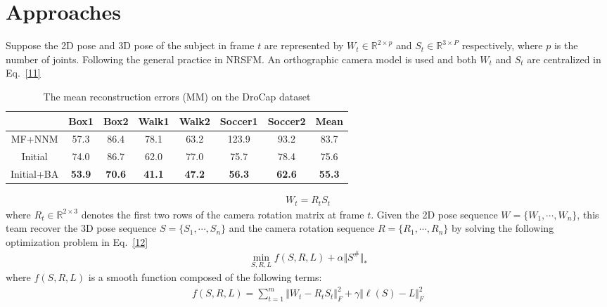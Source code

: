 \documentclass[10pt,twocolumn,letterpaper]{article}
\begin{document}
\section{Approaches}
Suppose the 2D pose and 3D pose of the subject in frame $t$ are represented by $W_t\in\mathbb{R}^{2\times p}$ and $S_t\in\mathbb{R}^{3\times P}$ respectively, where $p$ is the number of joints. Following the general practice in NRSFM. An orthographic camera model is used and both $W_t$ and $S_t$ are centralized in Eq.~\ref{11}
\begin{table*}
\small
\renewcommand\arraystretch{1.2}
\centering
\begin{tabular}{|c|c|c|c|c|c|c|c|}
\hline
 & Box1 & Box2 & Walk1 & Walk2 & Soccer1 & Soccer2 & Mean \\
\hline
MF+NNM \cite{Wandt20163D}& 57.3 & 86.4 & 78.1 & 63.2 & 123.9 & 93.2 & 83.7 \\
Initial & 74.0 & 86.7 & 62.0 & 77.0 & 75.7 & 78.4 & 75.6 \\
Initial+BA & \textbf{53.9} & \textbf{70.6} & \textbf{41.1} & \textbf{47.2} & \textbf{56.3} & \textbf{62.6} & \textbf{55.3} \\
\hline
\end{tabular} 
\caption{The mean reconstruction errors (MM) on the DroCap dataset}
\label{tab1}
\end{table*}
\par
\begin{equation}\label{11}
\begin{split}
W_t=R_tS_t
\end{split}
\end{equation}
where $R_t\in\mathbb{R}^{2\times 3}$ denotes the first two rows of the camera rotation matrix at frame $t$. Given the 2D pose sequence $W=\{W_1,\cdots,W_n\}$, this team recover the 3D pose sequence $S=\{S_1,\cdots, S_n\}$ and the camera rotation sequence $R=\{R_1,\cdots, R_n\}$ by solving the following optimization problem in Eq.~\ref{12}
\begin{equation}\label{12}
\begin{split}
\min_{S,R,L}f(S,R,L)+\alpha\Vert S^\#\Vert_*
\end{split}
\end{equation}
where $f(S,R,L)$ is a smooth function composed of the following terms:
\begin{equation}\label{13}
\begin{split}
f(S,R,L)=\sum_{t=1}^m\Vert W_t-R_tS_t\Vert_F^2+\gamma\Vert \ell(S)-L\Vert_F^2
\end{split}
\end{equation}
\end{document}
